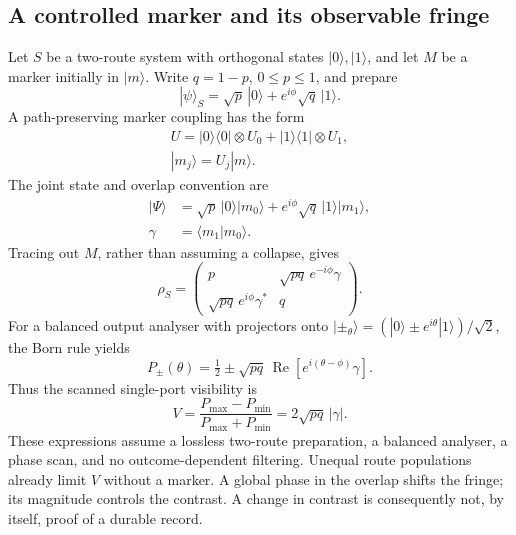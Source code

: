 \subsection{A controlled marker and its observable fringe}
Let $S$ be a two-route system with orthogonal states $|0\rangle,|1\rangle$, and let $M$ be a marker initially in $|m\rangle$. Write $q=1-p$, $0\leq p\leq1$, and prepare
\begin{equation}
 |\psi\rangle_S=\sqrt p\,|0\rangle
       +e^{i\phi}\sqrt q\,|1\rangle .
\end{equation}
A path-preserving marker coupling has the form
\begin{equation}
\begin{gathered}
U=|0\rangle\langle0|\otimes U_0
       +|1\rangle\langle1|\otimes U_1,
 \\
 |m_j\rangle=U_j|m\rangle .
\end{gathered}
\end{equation}
The joint state and overlap convention are
\begin{align}
 |\Psi\rangle&=\sqrt p\,|0\rangle|m_0\rangle
       +e^{i\phi}\sqrt q\,|1\rangle|m_1\rangle,\\
 \gamma&=\langle m_1|m_0\rangle .
\end{align}
Tracing out $M$, rather than assuming a collapse, gives
\begin{equation}
 \rho_S=\begin{pmatrix}
 p&\sqrt{pq}\,e^{-i\phi}\gamma\\
 \sqrt{pq}\,e^{i\phi}\gamma^*&q
 \end{pmatrix}.
 \label{eq:record-reduced}
\end{equation}
For a balanced output analyser with projectors onto
$|\!\pm_\theta\rangle=(|0\rangle\pm e^{i\theta}|1\rangle)/\sqrt2$,
the Born rule yields
\begin{equation}
 P_\pm(\theta)=\tfrac12\pm\sqrt{pq}\,
   \operatorname{Re}[e^{i(\theta-\phi)}\gamma].
 \label{eq:record-fringe}
\end{equation}
Thus the scanned single-port visibility is
\begin{equation}
 V=\frac{P_{\max}-P_{\min}}{P_{\max}+P_{\min}}
   =2\sqrt{pq}\,|\gamma|.
 \label{eq:record-visibility}
\end{equation}
These expressions assume a lossless two-route preparation, a balanced analyser, a phase scan, and no outcome-dependent filtering. Unequal route populations already limit $V$ without a marker. A global phase in the overlap shifts the fringe; its magnitude controls the contrast. A change in contrast is consequently not, by itself, proof of a durable record.

